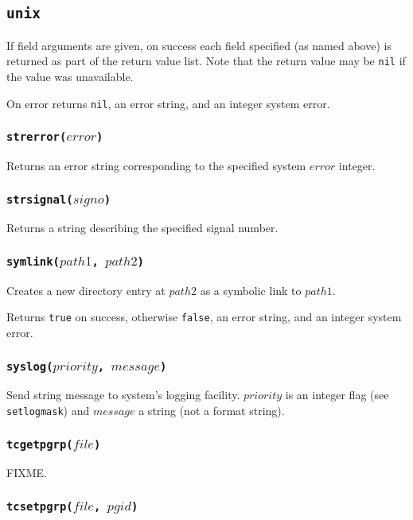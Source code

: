 \documentclass[11pt, oneside]{memoir}
\newcommand*{\true}[0]{\texttt{true}\xspace}
\newcommand*{\false}[0]{\texttt{false}\xspace}
\newcommand*{\nil}[0]{\texttt{nil}\xspace}
\newcommand*{\fn}[1]{\texttt{#1}\xspace}
\newcounter{toccols}
\newenvironment{Module}[1]{
	\subsection{\texttt{#1}}
	\addtocontents{toc}{
		\protect\begin{multicols}{\value{toccols}}
	}
}{
	\addtocontents{toc}{\protect\end{multicols}}
}
\begin{document}
\begin{Module}{unix}
If field arguments are given, on success each field specified (as named above) is returned as part of the return value list. Note that the return value may be \nil if the value was unavailable.

On error returns \nil, an error string, and an integer system error.

\subsubsection[\fn{strerror}]{\fn{strerror($error$)}}

Returns an error string corresponding to the specified system $error$ integer.

\subsubsection[\fn{strsignal}]{\fn{strsignal($signo$)}}

Returns a string describing the specified signal number.

\subsubsection[\fn{symlink}]{\fn{symlink($path1$, $path2$)}}

Creates a new directory entry at $path2$ as a symbolic link to $path1$.

Returns \true on success, otherwise \false, an error string, and an integer system error. 

\subsubsection[\fn{syslog}]{\fn{syslog($priority$, $message$)}}

Send string message to system's logging facility. $priority$ is an integer flag (see \fn{setlogmask}) and $message$ a string (not a format string).

\subsubsection[\fn{tcgetpgrp}]{\fn{tcgetpgrp($file$)}}

FIXME.

\subsubsection[\fn{tcsetpgrp}]{\fn{tcsetpgrp($file$, $pgid$)}}


\end{Module}
\end{document}
